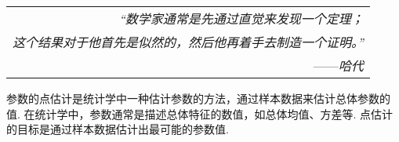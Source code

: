 \begin{flushright}
    \begin{tabular}{r|||}
        \textit{“数学家通常是先通过直觉来发现一个定理；}\\
        \textit{这个结果对于他首先是似然的，然后他再着手去制造一个证明。”}\\
        ——\textit{哈代}
    \end{tabular}
\end{flushright}

参数的点估计是统计学中一种估计参数的方法，通过样本数据来估计总体参数的值. 
在统计学中，参数通常是描述总体特征的数值，如总体均值、方差等. 点估计的目标是通过样本数据估计出最可能的参数值. 